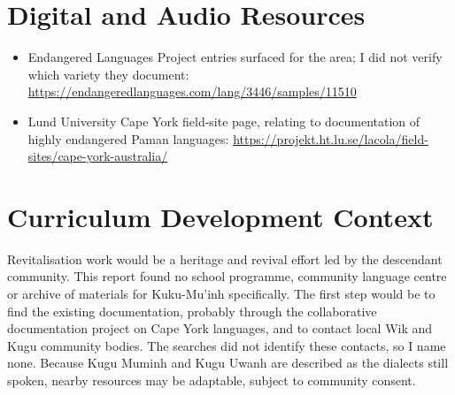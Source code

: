 \documentclass[12pt]{article}
\begin{document}
\section{Digital and Audio Resources}
\begin{itemize}
\item Endangered Languages Project entries surfaced for the area; I did not verify which variety they document: \url{https://endangeredlanguages.com/lang/3446/samples/11510}
\item Lund University Cape York field-site page, relating to documentation of highly endangered Paman languages: \url{https://projekt.ht.lu.se/lacola/field-sites/cape-york-australia/}
\end{itemize}

\section{Curriculum Development Context}
Revitalisation work would be a heritage and revival effort led by the descendant community. This report found no school programme, community language centre or archive of materials for Kuku-Mu'inh specifically. The first step would be to find the existing documentation, probably through the collaborative documentation project on Cape York languages, and to contact local Wik and Kugu community bodies. The searches did not identify these contacts, so I name none. Because Kugu Muminh and Kugu Uwanh are described as the dialects still spoken, nearby resources may be adaptable, subject to community consent.
\end{document}
